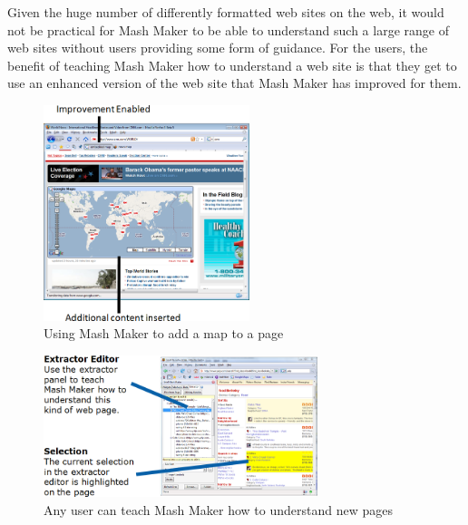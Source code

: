 \documentclass{chi2009}
\begin{document}
Given the huge number of differently formatted web sites on the web, it would not be practical for Mash Maker to be able to understand such a large range of web sites without users providing some form of guidance. For the users, the benefit of teaching Mash Maker how to understand a web site is that they get to use an enhanced version of the web site that Mash Maker has improved for them.


\begin{figure}[tb]
	\begin{center}
	\includegraphics[width=6cm]{../mmpics/mapinsert.png}
	\caption{Using Mash Maker to add a map to a page}
	\label{mapinsert}
	\end{center}
\end{figure}



\begin{figure}[tb]
	\begin{center}
	\includegraphics[width=8cm]{../mmpics/extractor_summary.png}
	\caption{Any user can teach Mash Maker how to understand new pages}
	\label{extractedit}
	\end{center}
\end{figure}
\end{document}
